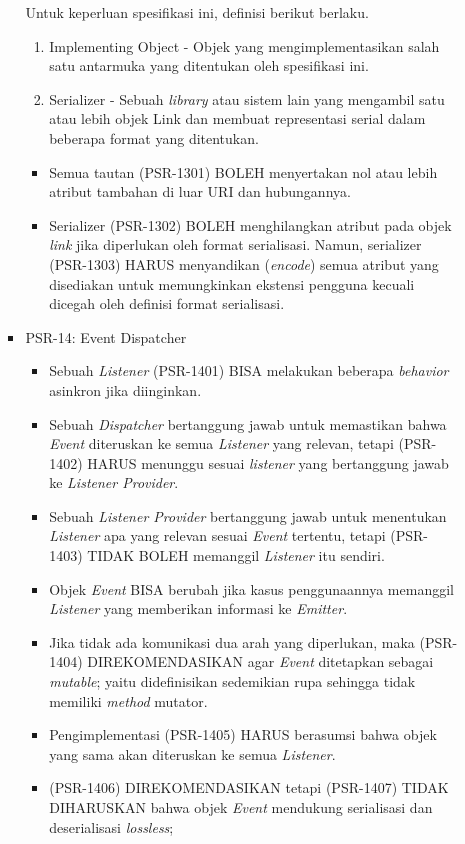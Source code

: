 \documentclass[a4paper,twoside]{article}
\begin{document}
\begin{enumerate}
\begin{enumerate}
\begin{itemize}
				Untuk keperluan spesifikasi ini, definisi berikut berlaku.
				\begin{enumerate}
					\item Implementing Object - Objek yang mengimplementasikan salah satu antarmuka yang ditentukan oleh spesifikasi ini.
					\item Serializer - Sebuah \textit{library} atau sistem lain yang mengambil satu atau lebih objek Link dan membuat representasi serial dalam beberapa format yang ditentukan.
				\end{enumerate}
				
				\begin{itemize}
					\item Semua tautan (PSR-1301) BOLEH menyertakan nol atau lebih atribut tambahan di luar URI dan hubungannya.
					\item Serializer (PSR-1302) BOLEH menghilangkan atribut pada objek \textit{link} jika diperlukan oleh format serialisasi. Namun, serializer (PSR-1303) HARUS menyandikan (\textit{encode}) semua atribut yang disediakan untuk memungkinkan ekstensi pengguna kecuali dicegah oleh definisi format serialisasi.
				\end{itemize}
				
				
				\item PSR-14: Event Dispatcher
				\label{subsubsec:psr14}
				\begin{itemize}
					\item Sebuah \textit{Listener} (PSR-1401) BISA melakukan beberapa \textit{behavior} asinkron jika diinginkan.
					\item Sebuah \textit{Dispatcher} bertanggung jawab untuk memastikan bahwa \textit{Event} diteruskan ke semua \textit{Listener} yang relevan, tetapi (PSR-1402) HARUS menunggu sesuai \textit{listener} yang bertanggung jawab ke \textit{Listener Provider}.
					\item Sebuah \textit{Listener Provider} bertanggung jawab untuk menentukan \textit{Listener} apa yang relevan sesuai \textit{Event} tertentu, tetapi (PSR-1403) TIDAK BOLEH memanggil \textit{Listener} itu sendiri.
					\item Objek \textit{Event} BISA berubah jika kasus penggunaannya memanggil \textit{Listener} yang memberikan informasi ke \textit{Emitter}.
					\item Jika tidak ada komunikasi dua arah yang diperlukan, maka (PSR-1404) DIREKOMENDASIKAN agar \textit{Event} ditetapkan sebagai \textit{mutable}; yaitu didefinisikan sedemikian rupa sehingga tidak memiliki \textit{method} mutator.
					\item Pengimplementasi (PSR-1405) HARUS berasumsi bahwa objek yang sama akan diteruskan ke semua \textit{Listener}.
					\item (PSR-1406) DIREKOMENDASIKAN tetapi (PSR-1407) TIDAK DIHARUSKAN bahwa objek \textit{Event} mendukung serialisasi dan deserialisasi \textit{lossless}; 
					

\end{itemize}
\end{itemize}
\end{enumerate}
\end{enumerate}
\end{document}
